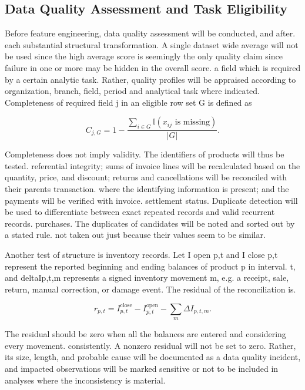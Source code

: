 \documentclass[a4paper,11pt,oneside]{book}
\theoremstyle{plain}
\theoremstyle{definition}
\theoremstyle{remark}
\begin{document}
\subsection{Data Quality Assessment and Task Eligibility}

Before feature engineering, data quality assessment will be conducted, and after. each substantial structural transformation. A single dataset wide average will not be used since the high average score is seemingly the only quality claim since failure in one or more may be hidden in the overall score. a field which is required by a certain analytic task. Rather, quality profiles will be appraised according to organization, branch, field, period and analytical task where indicated. Completeness of required field j in an eligible row set G is defined as

\begin{equation}
C_{j,G}=1-\frac{\sum_{i\in G}\mathbb{I}\!\left(x_{ij}\text{ is missing}\right)}{|G|}.
\label{eq:completeness}
\end{equation}

Completeness does not imply validity. The identifiers of products will thus be tested. referential integrity; sums of invoice lines will be recalculated based on the quantity, price, and discount; returns and cancellations will be reconciled with their parents transaction. where the identifying information is present; and the payments will be verified with invoice. settlement status. Duplicate detection will be used to differentiate between exact repeated records and valid recurrent records. purchases. The duplicates of candidates will be noted and sorted out by a stated rule. not taken out just because their values seem to be similar.

Another test of structure is inventory records. Let I open p,t and I close p,t represent the reported beginning and ending balances of product p in interval. t, and deltaIp,t,m represents a signed inventory movement m, e.g. a receipt, sale, return, manual correction, or damage event. The residual of the reconciliation is.

\begin{equation}
r_{p,t}=I^{\mathrm{close}}_{p,t}-I^{\mathrm{open}}_{p,t}-\sum_m \Delta I_{p,t,m}.
\label{eq:stock_reconciliation}
\end{equation}

The residual should be zero when all the balances are entered and considering every movement. consistently. A nonzero residual will not be set to zero. Rather, its size, length, and probable cause will be documented as a data quality incident, and impacted observations will be marked sensitive or not to be included in analyses where the inconsistency is material.
\end{document}
